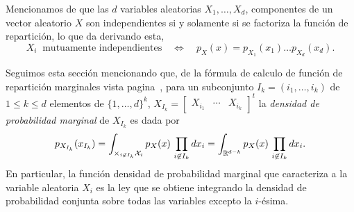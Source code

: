 Mencionamos de que las $d$  variables aleatorias $X_1, \ldots, X_d$, componentes
de un vector aleatorio $X$ son  independientes si y solamente si se factoriza la
funci\'on de repartici\'on, lo que da derivando esta,
%
\[
X_i \:  \mbox{ mutuamente independientes} \quad \Leftrightarrow  \quad p_X(x) =
p_{X_1}(x_1) \ldots p_{X_d}(x_d).
\]


Seguimos esta secci\'on mencionando que, de la f\'ormula de calculo de funci\'on
de  repartici\'on marginales vista  pagina~\pageref{Pagina:MP:MarginalesF}, para
un subconjunto $I_k = (i_1,\ldots,i_k)$ de $1  \le k \le d$ elementos de $\{ 1 ,
\ldots   ,  d   \}^k$,   $X_{I_k}   =  \begin{bmatrix}   X_{i_1}   &  \cdots   &
  X_{i_k}\end{bmatrix}^t$  la   {\it  densidad  de   probabilidad  marginal}  de
$X_{I_k}$ es dada por
%
\[
p_{X_{I_k}}(x_{I_k})  = \int_{\times_{i  \not\in  I_k} \mathcal{X}_i}  p_X(x) \,  \prod_{i
    \not\in I_k}  dx_i =  \int_{\mathbb{R}^{d-k}} p_X(x) \,  \prod_{i \not\in
      I_k} dx_i.
\]
%
En particular, la funci\'on densidad  de probabilidad marginal que caracteriza a
la variable aleatoria  $X_i$ es la ley que se obtiene  integrando la densidad de
probabilidad conjunta sobre todas las variables excepto la $i$-\'esima.

\

